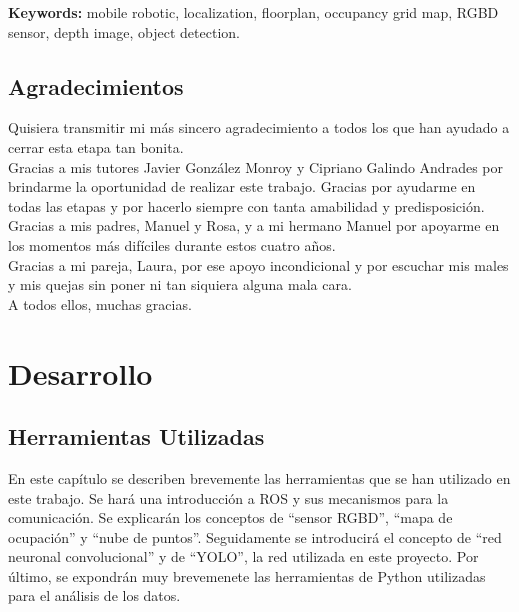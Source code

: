\textbf{Keywords:} mobile robotic, localization, floorplan, occupancy grid map, RGBD sensor, depth image, object detection.

\chapter*{Agradecimientos}

Quisiera transmitir mi más sincero agradecimiento a todos los que han ayudado a cerrar esta etapa tan bonita.\\

Gracias a mis tutores Javier González Monroy y Cipriano Galindo Andrades por brindarme la oportunidad de realizar este trabajo. Gracias por ayudarme en todas las etapas y por hacerlo siempre con tanta amabilidad y predisposición.\\

Gracias a mis padres, Manuel y Rosa, y a mi hermano Manuel por apoyarme en los momentos más difíciles durante estos cuatro años.\\

Gracias a mi pareja, Laura, por ese apoyo incondicional y por escuchar mis males y mis quejas sin poner ni tan siquiera alguna mala cara.\\

A todos ellos, muchas gracias.\\

\tableofcontents

\cleardoublepage
{} %
\listoffigures %

\cleardoublepage
{} %
\listoftables %



\part{Desarrollo}

\chapter{Herramientas Utilizadas}

En este capítulo se describen brevemente las herramientas que se han utilizado en este trabajo. Se hará una introducción a ROS y sus mecanismos para la comunicación. Se explicarán los conceptos de ``sensor RGBD'', ``mapa de ocupación'' y ``nube de puntos''. Seguidamente se introducirá el concepto de ``red neuronal convolucional'' y de ``YOLO'', la red utilizada en este proyecto. Por último, se expondrán muy brevemenete las herramientas de Python utilizadas para el análisis de los datos.\\


